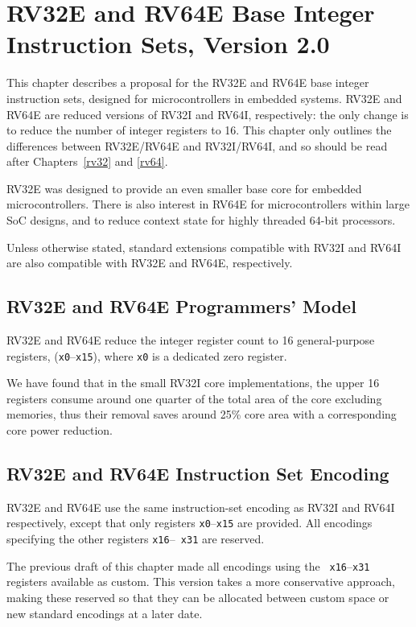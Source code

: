 \chapter{RV32E and RV64E Base Integer Instruction Sets, Version 2.0}
\label{rv32e}

This chapter describes a proposal for the RV32E and RV64E base integer
instruction sets, designed for microcontrollers in embedded systems.
RV32E and RV64E are reduced versions of RV32I and RV64I, respectively:
the only change is to reduce the number of integer registers to 16.
This chapter only outlines the differences between RV32E/RV64E and
RV32I/RV64I, and so should be read after Chapters~\ref{rv32} and
\ref{rv64}.

\begin{commentary}
RV32E was designed to provide an even smaller base core for embedded
microcontrollers.  There is also interest in RV64E for
microcontrollers within large SoC designs, and to reduce context state
for highly threaded 64-bit processors.

Unless otherwise stated, standard extensions compatible with RV32I
and RV64I are also compatible with RV32E and RV64E, respectively.
\end{commentary}

\section{RV32E and RV64E Programmers' Model}

RV32E and RV64E reduce the integer register count to 16
general-purpose registers, ({\tt x0}--{\tt x15}), where {\tt x0} is a
dedicated zero register.

\begin{commentary}
We have found that in the small RV32I core implementations, the upper
16 registers consume around one quarter of the total area of the core
excluding memories, thus their removal saves around 25\% core area
with a corresponding core power reduction.
\end{commentary}

\section{RV32E and RV64E Instruction Set Encoding}

RV32E and RV64E use the same instruction-set encoding as RV32I and
RV64I respectively, except that only registers {\tt x0}--{\tt x15} are
provided.  All encodings specifying the other registers {\tt x16}--{\tt
  x31} are reserved.

\begin{commentary}
The previous draft of this chapter made all encodings using the {\tt
  x16}--{\tt x31} registers available as custom.  This version takes a
more conservative approach, making these reserved so that they can be
allocated between custom space or new standard encodings at a later
date.
\end{commentary}
